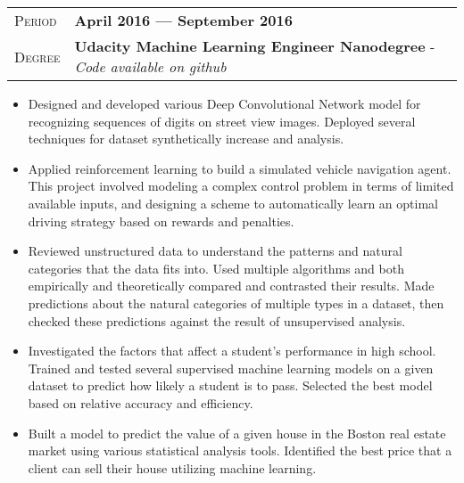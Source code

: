 \documentclass[10pt, a4paper, oneside, final]{scrartcl} %
\newcommand{\gray}{\rowcolor[gray]{.90}} %
\begin{document}
\begin{center}
\begin{tabularx}{1.0\linewidth}{>{\raggedleft\scshape}p{2.34cm}X}
\gray Period & \textbf{April 2016 --- September 2016}\\
\gray Degree & \textbf{Udacity Machine Learning Engineer Nanodegree} - \textit{Code available on github}\\
\end{tabularx}
\end{center}

\begin{itemize}\itemsep1.5pt
\item Designed and developed various Deep Convolutional Network model for recognizing sequences of digits on street view images. Deployed several techniques for dataset synthetically increase and analysis. 

\item Applied reinforcement learning to build a simulated vehicle navigation agent. This project involved modeling a complex control problem in terms of limited available inputs, and designing a scheme to automatically learn an optimal driving strategy based on rewards and penalties.

\item Reviewed unstructured data to understand the patterns and natural categories that the data fits into. Used multiple algorithms and both empirically and theoretically compared and contrasted their results. Made predictions about the natural categories of multiple types in a dataset, then checked these predictions against the result of unsupervised analysis.

\item Investigated the factors that affect a student's performance in high school. Trained and tested several supervised machine learning models on a given dataset to predict how likely a student is to pass. Selected the best model based on relative accuracy and efficiency.

\item Built a model to predict the value of a given house in the Boston real estate market using various statistical analysis tools. Identified the best price that a client can sell their house utilizing machine learning.

\end{itemize}

\end{document}

